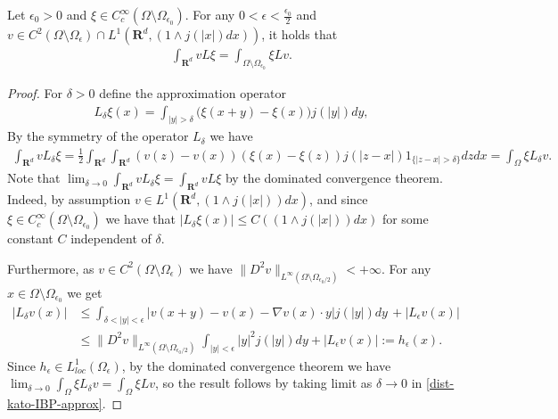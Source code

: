 \documentclass[10pt,a4paper]{amsart}
\newcommand{\rd}{\mathbf{R}^d}
\renewcommand{\leq}{\leqslant}
\begin{document}
\begin{lemma} \label{lemma:ibp}
Let $\epsilon_0>0$ and $\xi \in C^{\infty}_c(\Omega\setminus \Omega_{\epsilon_0})$. For any $0<\epsilon<\frac{\epsilon_0}{2}$ and $v\in C^2(\Omega\setminus\Omega_{\epsilon}) \cap L^1(\rd, (1\wedge j(|x|)dx))$, it holds that 
\begin{align} \label{dist-kato-IBP}
    \int_{\rd} v L\xi = \int_{\Omega\setminus\Omega_{\epsilon_0}} \xi Lv . 
\end{align}
\end{lemma}

\begin{proof}
For $\delta>0$ define the approximation operator 
\begin{align*}
    L_{\delta}\xi (x) = \int_{|y|>\delta} \big(\xi(x+y) -\xi(x)\big) j(|y|) dy, 
\end{align*}
By the symmetry of the operator $L_{\delta}$ we have 
\begin{align}\label{dist-kato-IBP-approx}
    \int_{\rd} v L_{\delta}\xi = \frac 1 2\int_{\rd}\int_{\rd}(v(z)-v(x))(\xi(x)-\xi(z))j(|z-x|)1_{\{|z-x|>\delta\}}dz dx=\int_{\Omega} \xi L_{\delta} v . 
\end{align}
Note that $\lim_{\delta\rightarrow 0} \int_{\rd} v L_{\delta}\xi = \int_{\rd} v L\xi$ by the dominated convergence theorem. Indeed, by assumption $v\in L^1(\rd, (1\wedge j(|x|))dx)$, and since $\xi \in C^{\infty}_c(\Omega\setminus\Omega_{\epsilon_0})$ we have that $|L_{\delta} \xi(x)|\leq C((1\wedge j(|x|))dx)$ for some constant $C$ independent of $\delta$. 

Furthermore, as $v\in C^2(\Omega\setminus\Omega_{\epsilon})$ we have $\|D^2 v\|_{L^{\infty}(\Omega\setminus\Omega_{\epsilon_0/2})}<+\infty$. For any $x\in \Omega\setminus\Omega_{\epsilon_0}$ we get
\begin{align*}
     |L_{\delta} v(x)|&\leq \int_{\delta< |y|<\epsilon} \big|v(x+y) -v(x)-\nabla v(x)\cdot y\big| j(|y|) dy \, + \big|L_{\epsilon} v(x) \big|\\ 
    & \leq \|D^2 v\|_{L^{\infty}(\Omega\setminus\Omega_{\epsilon_0/2})} \int_{|y|<\epsilon} |y|^2 j(|y|) dy + |L_{\epsilon} v(x)| := h_\epsilon(x).  
\end{align*}
Since $h_\epsilon \in L^1_{loc}(\Omega_\epsilon)$, by the dominated convergence theorem we have $\lim_{\delta\rightarrow 0} \int_{\Omega} \xi L_{\delta} v = \int_{\Omega} \xi L v$, so the result follows by taking limit as $\delta \rightarrow 0$ in \eqref{dist-kato-IBP-approx}.
\end{proof}
\end{document}
